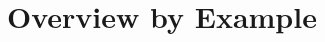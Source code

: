 \documentclass{article}
\theoremstyle{plain}
\theoremstyle{definition}
\newcommand{\enew}{\endgroup}
\begin{document}
%
%
%
\section{Overview by Example}\label{sec:overview}
\end{document}

